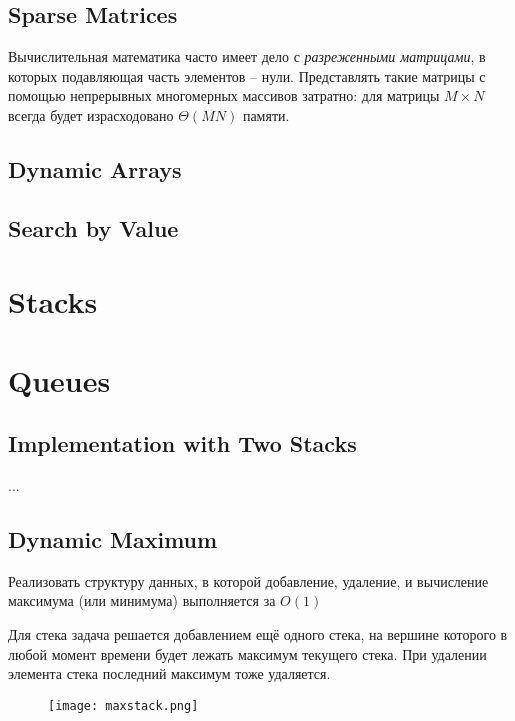 \subsection*{Sparse Matrices}

Вычислительная математика часто имеет дело с {\em разреженными матрицами}, в которых подавляющая часть элементов -- нули. Представлять такие матрицы с помощью непрерывных многомерных массивов затратно: для матрицы $M\times N$ всегда будет израсходовано $\Theta(MN)$ памяти.

\subsection*{Dynamic Arrays}

\subsection*{Search by Value}

\section{Stacks}

\section{Queues}

\subsection*{Implementation with Two Stacks}

...


\subsection*{Dynamic Maximum}

\begin{problem}
Реализовать структуру данных, в которой добавление, удаление, и вычисление максимума (или минимума) выполняется за $O(1)$
\end{problem}

Для стека задача решается добавлением ещё одного стека, на вершине которого в любой момент времени будет лежать максимум текущего стека. При удалении элемента стека последний максимум тоже удаляется.

\begin{figure}[!ht]
\centering
\texttt{[image: maxstack.png]}
\end{figure}

